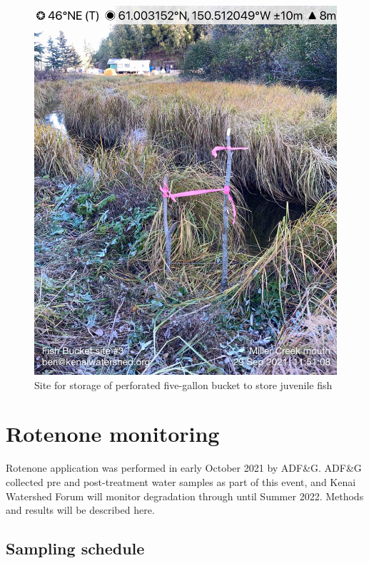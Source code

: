 \documentclass[
]{book}
\begin{document}
\begin{figure}
\centering
\includegraphics{images/fish_rescue/IMG-6274.jpg}
\caption{\label{fig:unnamed-chunk-22}Site for storage of perforated five-gallon bucket to store juvenile fish}
\end{figure}

\hypertarget{rotenone-monitoring}{%
\chapter{Rotenone monitoring}\label{rotenone-monitoring}}

Rotenone application was performed in early October 2021 by ADF\&G. ADF\&G collected pre and post-treatment water samples as part of this event, and Kenai Watershed Forum will monitor degradation through until Summer 2022. Methods and results will be described here.

\hypertarget{sampling-schedule}{%
\section{Sampling schedule}\label{sampling-schedule}}
\end{document}
